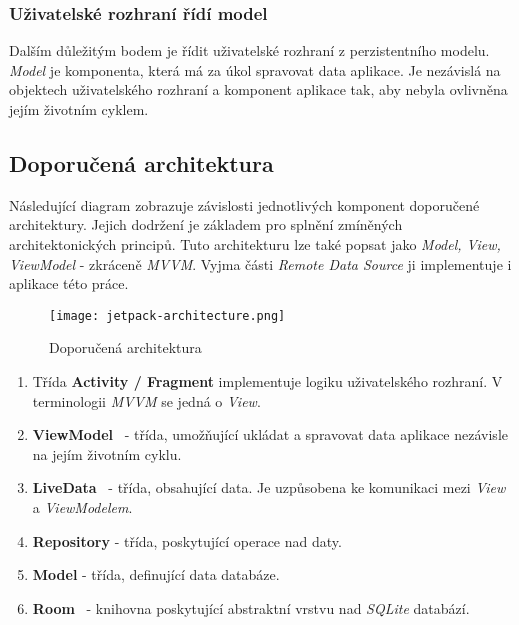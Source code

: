         \subsubsection{Uživatelské rozhraní řídí model}
        Dalším důležitým bodem je řídit uživatelské rozhraní z perzistentního modelu. \emph{Model} je komponenta, která má za úkol spravovat data aplikace. Je nezávislá na objektech uživatelského rozhraní a komponent aplikace tak, aby nebyla ovlivněna jejím životním cyklem.

        \newpage
        \subsection{Doporučená architektura}
        Následující diagram zobrazuje závislosti jednotlivých komponent doporučené architektury. Jejich dodržení je základem pro splnění zmíněných architektonických principů. Tuto architekturu lze také popsat jako \emph{Model, View, ViewModel} - zkráceně \emph{MVVM}. Vyjma části \emph{Remote Data Source} ji implementuje i aplikace této práce.

        \begin{figure}[h!]
            \centering
            \vspace{0.5cm}
            \texttt{[image: jetpack-architecture.png]}
            \caption[Architektura aplikace]{Doporučená architektura~\cite{app-architecture-guide}}
            \label{diagram:jetpack_arch}
        \end{figure}
        
        \begin{enumerate}
            \item Třída \textbf{Activity / Fragment} implementuje logiku uživatelského rozhraní. V terminologii \emph{MVVM} se jedná o \emph{View}.
            \item \textbf{ViewModel}~ - třída, umožňující ukládat a spravovat data aplikace nezávisle na jejím životním cyklu.\label{arch:viewmodel}
            \item \textbf{LiveData}~\cite{livedata} - třída, obsahující data. Je uzpůsobena ke komunikaci mezi \emph{View} a \emph{ViewModelem}. 
            \item \textbf{Repository} - třída, poskytující operace nad daty.
            \item \textbf{Model} - třída, definující data databáze.
            \item \textbf{Room}~ - knihovna poskytující abstraktní vrstvu nad \emph{SQLite} databází.
        \end{enumerate}

